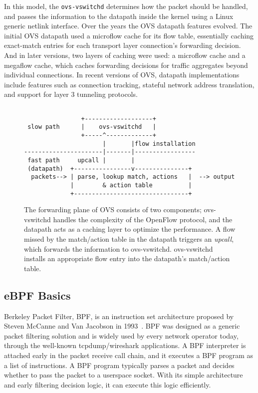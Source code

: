 \documentclass[10pt,numbers,reprint]{sigplanconf}
\begin{document}
In this model, the \verb+ovs-vswitchd+ determines how the packet should be handled,
and passes the information to the datapath inside the kernel using a
Linux generic netlink interface.  Over the years the OVS datapath features evolved.
The initial OVS datapath used a microflow cache for its flow table,
essentially caching exact-match entries for each
transport layer connection's forwarding decision.  And in later versions,
two layers of caching were used: a microflow cache and a megaflow cache,
which caches forwarding decisions for traffic aggregates beyond individual
connections.  In recent versions of OVS, datapath implementations include
features such as connection tracking, stateful network address translation, and
support for layer 3 tunneling protocols.

\begin{figure}
{\scriptsize
\begin{verbatim}
              
                +-------------------+
 slow path      |    ovs-vswitchd   |
                +-----^-------------+
                      |       |flow installation
----------------------|-------|-----------------
 fast path     upcall |       | 
 (datapath)  +----------------v---------------+ 
  packets--> | parse, lookup match, actions   |  --> output
             |        & action table          |
             +--------------------------------+
\end{verbatim}
}
\vspace{-1.0em}
\caption{
The forwarding plane of OVS consists of two components;
ovs-vswitchd handles the complexity of the OpenFlow protocol, and the
datapath acts as a caching layer to optimize the performance.  A flow
missed by the match/action table in the datapath triggers an {\em
upcall}, which forwards the information to ovs-vswitchd.  ovs-vswitchd
installs an appropriate flow entry into the datapath's match/action table.}
\label{ovsintro}
\vspace{-1.0em}
\end{figure}

\subsection{eBPF Basics}\label{sec:ebpf}
Berkeley Packet Filter, BPF, is an instruction set architecture
proposed by Steven McCanne and Van Jacobson in 1993~\cite{cbpf}.  
BPF was designed as a generic packet filtering solution and is widely
used by every network operator today, through the well-known tcpdump/wireshark
applications. A BPF interpreter is attached early in the packet receive call
chain, and it executes a BPF program as a list of instructions.
A BPF program typically parses a packet and decides
whether to pass the packet to a userspace socket.  With its simple architecture
and early filtering decision logic, it can execute this logic efficiently.
\end{document}
